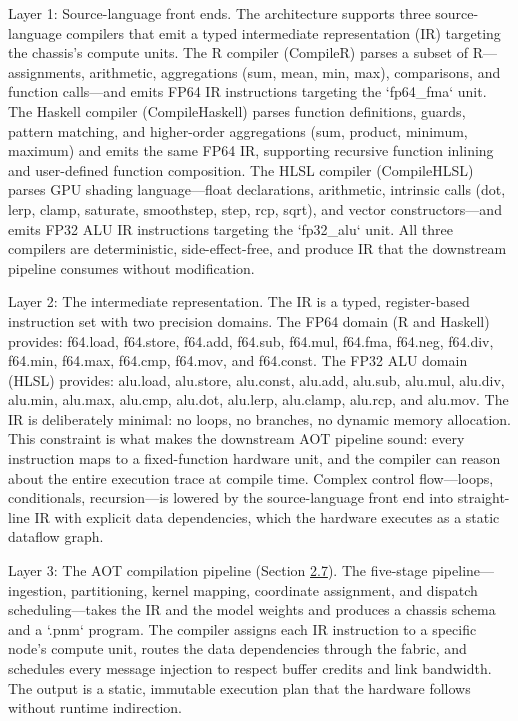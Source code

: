 \documentclass[10pt,twocolumn]{article}
\begin{document}
Layer 1: Source-language front ends. The architecture supports three source-language compilers that emit a typed intermediate representation (IR)\cite{18} targeting the chassis's compute units. The R compiler (CompileR) parses a subset of R---assignments, arithmetic, aggregations (sum, mean, min, max), comparisons, and function calls---and emits FP64 IR instructions targeting the `fp64\_fma` unit. The Haskell compiler (CompileHaskell) parses function definitions, guards, pattern matching, and higher-order aggregations (sum, product, minimum, maximum) and emits the same FP64 IR, supporting recursive function inlining and user-defined function composition. The HLSL compiler (CompileHLSL) parses GPU shading language---float declarations, arithmetic, intrinsic calls (dot, lerp, clamp, saturate, smoothstep, step, rcp, sqrt), and vector constructors---and emits FP32 ALU IR instructions targeting the `fp32\_alu` unit. All three compilers are deterministic, side-effect-free, and produce IR that the downstream pipeline consumes without modification.

Layer 2: The intermediate representation. The IR is a typed, register-based instruction set with two precision domains. The FP64 domain (R and Haskell) provides: f64.load, f64.store, f64.add, f64.sub, f64.mul, f64.fma, f64.neg, f64.div, f64.min, f64.max, f64.cmp, f64.mov, and f64.const. The FP32 ALU domain (HLSL) provides: alu.load, alu.store, alu.const, alu.add, alu.sub, alu.mul, alu.div, alu.min, alu.max, alu.cmp, alu.dot, alu.lerp, alu.clamp, alu.rcp, and alu.mov. The IR is deliberately minimal: no loops, no branches, no dynamic memory allocation. This constraint is what makes the downstream AOT pipeline sound: every instruction maps to a fixed-function hardware unit, and the compiler can reason about the entire execution trace at compile time. Complex control flow---loops, conditionals, recursion---is lowered by the source-language front end into straight-line IR with explicit data dependencies, which the hardware executes as a static dataflow graph.

Layer 3: The AOT compilation pipeline (Section \hyperref[sec:2.7]{2.7}). The five-stage pipeline---ingestion, partitioning, kernel mapping, coordinate assignment, and dispatch scheduling---takes the IR and the model weights and produces a chassis schema and a `.pnm` program. The compiler assigns each IR instruction to a specific node's compute unit, routes the data dependencies through the fabric, and schedules every message injection to respect buffer credits and link bandwidth. The output is a static, immutable execution plan that the hardware follows without runtime indirection.
\end{document}
